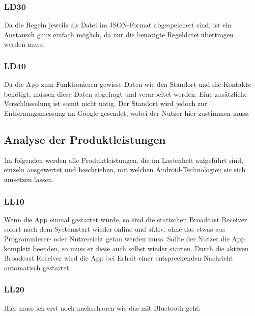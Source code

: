 \subsubsection{LD30}
Da die Regeln jeweils als Datei im JSON-Format abgespeichert sind, ist ein Austausch ganz einfach m\"oglich, da nur die ben\"otigte Regeldatei \"ubertragen werden muss.

\subsubsection{LD40}
Da die App zum Funktionieren gewisse Daten wie den Standort und die Kontakte ben\"otigt, m\"ussen diese Daten abgefragt und verarbeitet werden. Eine zus\"atzliche Verschl\"usselung ist somit nicht n\"otig. Der Standort wird jedoch zur Entfernungsmessung an Google gesendet, wobei der Nutzer hier zustimmen muss.


\subsection{Analyse der Produktleistungen}
Im folgenden werden alle Produktleistungen, die im Lastenheft aufgef\"uhrt sind, einzeln ausgewertet und beschrieben, mit welchen Android-Technologien sie sich umsetzen lassen.

\subsubsection{LL10}
Wenn die App einmal gestartet wurde, so sind die statischen Broadcast Receiver sofort nach dem Systemstart wieder online und aktiv, ohne das etwas aus Programmierer- oder Nutzersicht getan werden muss. Sollte der Nutzer die App komplett beenden, so muss er diese auch selbst wieder starten.
Durch die aktiven Broadcast Receiver wird die App bei Erhalt einer entsprechenden Nachricht automatisch gestartet.

\subsubsection{LL20}
{\color{red}Hier muss ich erst noch nachschauen wie das mit Bluetooth geht.}